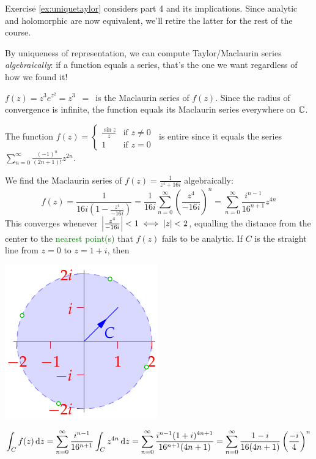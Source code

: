 Exercise \ref{ex:uniquetaylor} considers part 4 and its implications. Since analytic and holomorphic are now equivalent, we'll retire the latter for the rest of the course. 

\begin{examples}{}{}
By uniqueness of representation, we can compute Taylor/Maclaurin series \emph{algebraically}: if a function equals a series, that's the one we want regardless of how we found it!
\begin{enumerate}
  \item $f(z)=z^3e^{z^2}=z^3$ \,$\mathrel{=}$\, is the Maclaurin series of $f(z)$. Since the radius of convergence is infinite, the function equals its Maclaurin series everywhere on $\mathbb{C}$.
  
  \item The function $f(z)=\begin{cases}
  \frac{\sin z}z&\text{if }z\neq 0\\
  1&\text{if }z=0
  \end{cases}\ $ is entire since it equals the series $\sum\limits_{n=0}^\infty\frac{(-1)^n}{(2n+1)!}z^{2n}$.
  
  \begin{minipage}[t]{0.7\linewidth}\vspace{0pt}
  \item We find the Maclaurin series of $f(z)=\frac 1{z^4+16i}$ algebraically:
  \[f(z)=\frac 1{16i\left(1-\frac{z^4}{-16i}\right)} =\frac 1{16i}\sum_{n=0}^\infty\left(\frac{z^4}{-16i}\right)^n =\sum_{n=0}^\infty\frac{i^{n-1}}{16^{n+1}}z^{4n}\]
  This converges whenever $\left| \frac{z^4}{-16i}\right|<1\iff \left| z\right|<2$, equalling the distance from the center to the \textcolor{Green}{nearest point(s)} that $f(z)$ fails to be analytic. If $C$ is the straight line from $z=0$ to $z=1+i$, then
  \end{minipage}\begin{minipage}[t]{0.3\linewidth}\vspace{0pt}
  \flushright\includegraphics{taylorex3}
  \end{minipage}\par  
  \[\int_Cf(z)\,{\mathrm{d} z}=\sum_{n=0}^\infty\frac{i^{n-1}}{16^{n+1}}\int_Cz^{4n}\,{\mathrm{d} z} =\sum_{n=0}^\infty\frac{i^{n-1}(1+i)^{4n+1}}{16^{n+1}(4n+1)} =\sum_{n=0}^\infty\frac{1-i}{16(4n+1)}\left(\frac{-i}{4}\right)^n\] 
\end{enumerate}
\end{examples}

